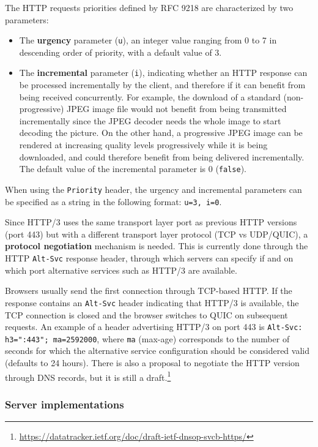 The HTTP requests priorities defined by RFC 9218 are characterized by two parameters:

\begin{itemize}
    \item The \textbf{urgency} parameter (\texttt{u}), an integer value ranging from 0 to 7 in descending order of priority, with a default value of 3.
    \item The \textbf{incremental} parameter (\texttt{i}), indicating whether an HTTP response can be processed incrementally by the client, and therefore if it can benefit from being received concurrently. For example, the download of a standard (non-progressive) JPEG image file would not benefit from being transmitted incrementally since the JPEG decoder needs the whole image to start decoding the picture. On the other hand, a progressive JPEG image can be rendered at increasing quality levels progressively while it is being downloaded, and could therefore benefit from being delivered incrementally. The default value of the incremental parameter is 0 (\texttt{false}).
\end{itemize}

When using the \texttt{Priority} header, the urgency and incremental parameters can be specified as a string in the following format: \texttt{u=3, i=0}.

Since HTTP/3 uses the same transport layer port as previous HTTP versions (port 443) but with a different transport layer protocol (TCP vs UDP/QUIC), a \textbf{protocol negotiation} mechanism is needed. This is currently done through the HTTP \texttt{Alt-Svc} response header, through which servers can specify if and on which port alternative services such as HTTP/3 are available.

Browsers usually send the first connection through TCP-based HTTP. If the response contains an \texttt{Alt-Svc} header indicating that HTTP/3 is available, the TCP connection is closed and the browser switches to QUIC on subsequent requests. An example of a header advertising HTTP/3 on port 443 is \verb|Alt-Svc: h3=":443"; ma=2592000|, where \texttt{ma} (max-age) corresponds to the number of seconds for which the alternative service configuration should be considered valid (defaults to 24 hours). There is also a proposal to negotiate the HTTP version through DNS records, but it is still a draft.\footnote{\url{https://datatracker.ietf.org/doc/draft-ietf-dnsop-svcb-https/}}

\subsubsection{Server implementations}
\label{sec:bg/http3/servers}

